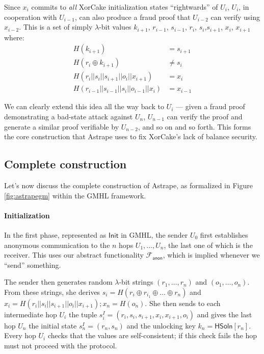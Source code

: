 \documentclass[USenglish,oneside,twocolumn]{article}
\begin{document}
Since $x_i$ commits to \emph{all} XorCake initialization states ``rightwards'' of $U_i$, $U_i$, in cooperation with $U_{i-1}$, can also produce a fraud proof that $U_{i-2}$ can verify using $x_{i-2}$. This is a set of simply $\lambda$-bit values $k_{i+1}$, $r_{i-1}$, $s_{i-1}$, $r_i$, $s_i$,$s_{i+1}$, $x_i$, $x_{i+1}$ where:
\begin{align*}
    H(k_{i+1})                               & = s_{i+1} \\
    H(r_i \oplus k_{i+1})                    & \neq s_i  \\
    H(r_i||s_i||s_{i+1}||o_i||x_{i+1})       & = x_i     \\
    H(r_{i-1}||s_{i-1}||s_{i}||o_{i-1}||x_i) & = x_{i-1}
\end{align*}

We can clearly extend this idea all the way back to $U_i$ --- given a fraud proof demonstrating a bad-state attack against $U_n$, $U_{n-1}$ can verify the proof and generate a similar proof verifiable by $U_{n-2}$, and so on and so forth. This forms the core construction that Astrape uses to fix XorCake's lack of balance security.

\subsection{Complete construction}

Let's now discuss the complete construction of Astrape, as formalized in Figure \ref{fig:astrapegm} within the GMHL framework.

\paragraph*{Initialization}

In the first phase, represented as $\mathsf{Init}$ in GMHL, the sender $U_0$ first establishes anonymous communication to the $n$ hops $U_1,\dots,U_n$, the last one of which is the receiver. This uses our abstract functionality $\mathcal{F}_\mathsf{anon}$, which is implied whenever we ``send'' something.

The sender then generates random $\lambda$-bit strings $(r_1,\dots,r_n)$ and $(o_1,\dots,o_n)$. From these strings, she derives $s_i=H(r_i\oplus r_{i_1}\oplus\dots \oplus r_n)$ and $x_i=H(r_i||s_i||s_{i+1}||o_i||x_{i+1}); x_n=H(o_n)$. She then sends to each intermediate hop $U_i$ the tuple $s^I_i=(r_i,s_i,s_{i+1},x_i,x_{i+1},o_i)$ and gives the last hop $U_n$ the initial state $s^I_n=(r_n,s_n)$ and the unlocking key $k_n=\mathsf{HSoln}[r_n]$. Every hop $U_i$ checks that the values are self-consistent; if this check fails the hop must not proceed with the protocol.
\end{document}
